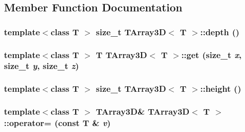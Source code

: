 \subsection{Member Function Documentation}
\hypertarget{classTArray3D_a14f076bd64b1989e8f65a49366d7823f}{
\subsubsection[{depth}]{\setlength{\rightskip}{0pt plus 5cm}template$<$class T $>$ size\_\-t {\bf TArray3D}$<$ T $>$::depth ()}}
\label{classTArray3D_a14f076bd64b1989e8f65a49366d7823f}
\hypertarget{classTArray3D_a8b2076b8a594dc5e69b143e12afbce1e}{
\subsubsection[{get}]{\setlength{\rightskip}{0pt plus 5cm}template$<$class T $>$ T {\bf TArray3D}$<$ T $>$::get (size\_\-t {\em x}, \/  size\_\-t {\em y}, \/  size\_\-t {\em z})}}
\label{classTArray3D_a8b2076b8a594dc5e69b143e12afbce1e}
\hypertarget{classTArray3D_a5c908ba2b371cc028c028448e9e522ed}{
\subsubsection[{height}]{\setlength{\rightskip}{0pt plus 5cm}template$<$class T $>$ size\_\-t {\bf TArray3D}$<$ T $>$::height ()}}
\label{classTArray3D_a5c908ba2b371cc028c028448e9e522ed}
\hypertarget{classTArray3D_a8ac9b63c65f2ca5e068812f1e69f4900}{
\subsubsection[{operator=}]{\setlength{\rightskip}{0pt plus 5cm}template$<$class T $>$ {\bf TArray3D}\& {\bf TArray3D}$<$ T $>$::operator= (const T \& {\em v})}}
\label{classTArray3D_a8ac9b63c65f2ca5e068812f1e69f4900}
